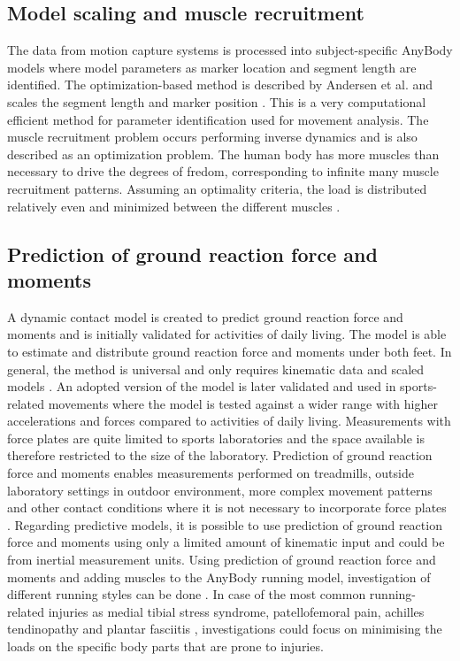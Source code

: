     \subsection{Model scaling and muscle recruitment}
        The data from motion capture systems is processed into subject-specific AnyBody models where model parameters as marker location and segment length are identified. The optimization-based method is described by Andersen et al. and scales the segment length and marker position \parencite{Andersen2010a}. This is a very computational efficient method for parameter identification used for movement analysis. The muscle recruitment problem occurs performing inverse dynamics and is also described as an optimization problem. The human body has more muscles than necessary to drive the degrees of fredom, corresponding to infinite many muscle recruitment patterns. Assuming an optimality criteria, the load is distributed relatively even and minimized between the different muscles \parencite{Damsgaard2006}. 
    
    \subsection{Prediction of ground reaction force and moments}
        A dynamic contact model is created to predict ground reaction force and moments and is initially validated for activities of daily living. The model is able to estimate and distribute ground reaction force and moments under both feet. In general, the method is universal and only requires kinematic data and scaled models \parencite{Fluit2014}. An adopted version of the model is later validated and used in sports-related movements where the model is tested against a wider range with higher accelerations and forces compared to activities of daily living. Measurements with force plates are quite limited to sports laboratories and the space available is therefore restricted to the size of the laboratory. Prediction of ground reaction force and moments enables measurements performed on treadmills, outside laboratory settings in outdoor environment, more complex movement patterns and other contact conditions where it is not necessary to incorporate force plates \parencite{Skals2017}. Regarding predictive models, it is possible to use prediction of ground reaction force and moments using only a limited amount of kinematic input and could be from inertial measurement units. Using prediction of ground reaction force and moments and adding muscles to the AnyBody running model, investigation of different running styles can be done \parencite{Rasmussen2019}. In case of the most common running-related injuries as medial tibial stress syndrome, patellofemoral pain, achilles tendinopathy and plantar fasciitis \parencite{Bredeweg2014, Lopes2012}, investigations could focus on minimising the loads on the specific body parts that are prone to injuries. 




